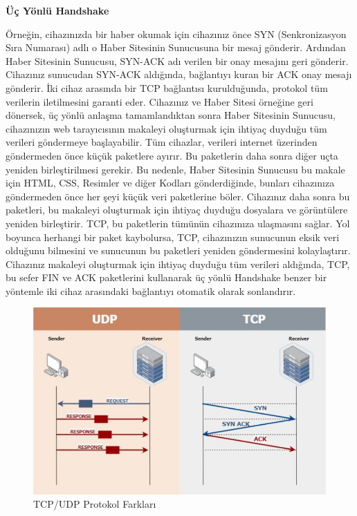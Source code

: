 \vspace{10mm}
\textbf{Üç Yönlü Handshake}
\vspace{5mm}

Örneğin, cihazınızda bir haber okumak için cihazınız önce SYN (Senkronizasyon Sıra Numarası) adlı o Haber Sitesinin Sunucusuna bir mesaj gönderir. 
Ardından Haber Sitesinin Sunucusu, SYN-ACK adı verilen bir onay mesajını geri gönderir.
Cihazınız sunucudan SYN-ACK aldığında, bağlantıyı kuran bir ACK onay mesajı gönderir.
İki cihaz arasında bir TCP bağlantısı kurulduğunda, protokol tüm verilerin iletilmesini garanti eder.
Cihazınız ve Haber Sitesi örneğine geri dönersek, üç yönlü anlaşma tamamlandıktan sonra Haber Sitesinin Sunucusu, cihazınızın web tarayıcısının makaleyi oluşturmak için ihtiyaç duyduğu tüm verileri göndermeye başlayabilir.
Tüm cihazlar, verileri internet üzerinden göndermeden önce küçük paketlere ayırır. Bu paketlerin daha sonra diğer uçta yeniden birleştirilmesi gerekir.
Bu nedenle, Haber Sitesinin Sunucusu bu makale için HTML, CSS, Resimler ve diğer Kodları gönderdiğinde, bunları cihazınıza göndermeden önce her şeyi küçük veri paketlerine böler. Cihazınız daha sonra bu paketleri, bu makaleyi oluşturmak için ihtiyaç duyduğu dosyalara ve görüntülere yeniden birleştirir.
TCP, bu paketlerin tümünün cihazınıza ulaşmasını sağlar. Yol boyunca herhangi bir paket kaybolursa, TCP, cihazınızın sunucunun eksik veri olduğunu bilmesini ve sunucunun bu paketleri yeniden göndermesini kolaylaştırır.
Cihazınız makaleyi oluşturmak için ihtiyaç duyduğu tüm verileri aldığında, TCP, bu sefer FIN ve ACK paketlerini kullanarak üç yönlü Handshake benzer bir yöntemle iki cihaz arasındaki bağlantıyı otomatik olarak sonlandırır.

\vspace{15mm}

\begin{figure}[!htb]
    \centering
    \includegraphics[width=1\linewidth]{00-images/14-tcp_udp.png}
    \caption{TCP/UDP Protokol Farkları}
    \label{fig:my_label}
\end{figure}


